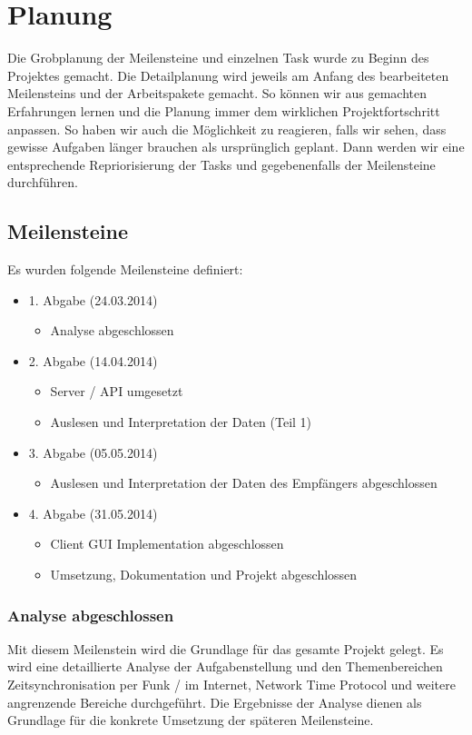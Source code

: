 \section{Planung}

Die Grobplanung der Meilensteine und einzelnen Task wurde zu Beginn des Projektes gemacht. Die Detailplanung wird jeweils am Anfang des bearbeiteten Meilensteins und der Arbeitspakete gemacht. So können wir aus gemachten Erfahrungen lernen und die Planung immer dem wirklichen Projektfortschritt anpassen. So haben wir auch die Möglichkeit zu reagieren, falls wir sehen, dass gewisse Aufgaben länger brauchen als ursprünglich geplant. Dann werden wir eine entsprechende Repriorisierung der Tasks und gegebenenfalls der Meilensteine durchführen.

\subsection{Meilensteine}
Es wurden folgende Meilensteine definiert:

\begin{itemize}
\item 1. Abgabe (24.03.2014)
	\begin{itemize}
	\item Analyse abgeschlossen
	\end{itemize}
\item 2. Abgabe (14.04.2014)
	\begin{itemize}
	\item Server / API umgesetzt
	\item Auslesen und Interpretation der Daten (Teil 1)
	\end{itemize}
\item 3. Abgabe (05.05.2014)
	\begin{itemize}
	\item Auslesen und Interpretation der Daten des Empfängers abgeschlossen
	\end{itemize}
\item 4. Abgabe (31.05.2014)
	\begin{itemize}
	\item Client GUI Implementation abgeschlossen
	\item Umsetzung, Dokumentation und Projekt abgeschlossen
	\end{itemize}
\end{itemize}

\subsubsection{Analyse abgeschlossen}
Mit diesem Meilenstein wird die Grundlage für das gesamte Projekt gelegt. Es wird eine detaillierte Analyse der Aufgabenstellung und den Themenbereichen Zeitsynchronisation per Funk / im Internet, Network Time Protocol und weitere angrenzende Bereiche durchgeführt. Die Ergebnisse der Analyse dienen als Grundlage für die konkrete Umsetzung der späteren Meilensteine.

